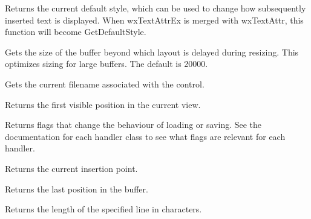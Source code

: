 Returns the current default style, which can be used to change how subsequently inserted
text is displayed. When wxTextAttrEx is merged with wxTextAttr, this function
will become GetDefaultStyle.

\label{wxrichtextctrlgetdelayedlayoutthreshold}


Gets the size of the buffer beyond which layout is delayed during resizing.
This optimizes sizing for large buffers. The default is 20000.

\label{wxrichtextctrlgetfilename}


Gets the current filename associated with the control.

\label{wxrichtextctrlgetfirstvisibleposition}


Returns the first visible position in the current view.

\label{wxrichtextfilehandlergethandlerflags}


Returns flags that change the behaviour of loading or saving. See the documentation for each
handler class to see what flags are relevant for each handler.

\label{wxrichtextctrlgetinsertionpoint}


Returns the current insertion point.

\label{wxrichtextctrlgetlastposition}


Returns the last position in the buffer.

\label{wxrichtextctrlgetlinelength}


Returns the length of the specified line in characters.

\label{wxrichtextctrlgetlinetext}

